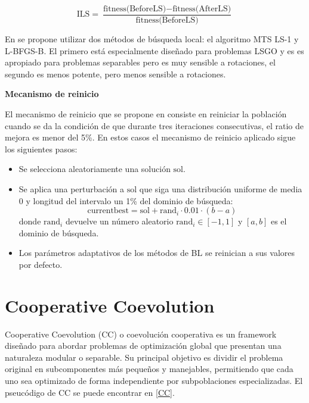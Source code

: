 \[
\text{ILS} = \frac{\text{fitness(BeforeLS)} - \text{fitness(AfterLS)}}{\text{fitness(BeforeLS)}}
\]

\vspace{10px}

En \cite{Molina2018} se propone utilizar dos métodos de búsqueda local: el algoritmo MTS LS-1 y L-BFGS-B. El primero está especialmente diseñado para problemas LSGO y es es apropiado para problemas separables pero es muy sensible a rotaciones, el segundo es menos potente, pero menos sensible a rotaciones.

\vspace{10px}

\noindent\textbf{Mecanismo de reinicio}

El mecanismo de reinicio que se propone en \citep{Molina2018} consiste en reiniciar la población cuando se da la condición de que durante tres iteraciones consecutivas, el ratio de mejora es menor del 5\%. En estos casos el mecanismo de reinicio aplicado sigue los siguientes pasos:

\begin{itemize}
    \item Se selecciona aleatoriamente una solución \( \text{sol} \).
    \item Se aplica una perturbación a \( \text{sol} \) que siga una distribución uniforme de media $0$ y longitud del intervalo un 1\% del dominio de búsqueda:
    \[
    \text{currentbest} = \text{sol} + \text{rand}_{i} \cdot 0.01 \cdot (b - a)
    \]
    donde \( \text{rand}_{i} \) devuelve un número aleatorio \( \text{rand}_{i} \in [-1, 1] \) y \( [a, b] \) es el dominio de búsqueda.
    \item Los parámetros adaptativos de los métodos de BL se reinician a sus valores por defecto.
\end{itemize}

\section{Cooperative Coevolution}

Cooperative Coevolution (CC) o coevolución cooperativa \cite{CC_orig} es un framework diseñado para abordar problemas de optimización global que presentan una naturaleza modular o separable. Su principal objetivo es dividir el problema original en subcomponentes más pequeños y manejables, permitiendo que cada uno sea optimizado de forma independiente por subpoblaciones especializadas. El pseucódigo de CC se puede encontrar en \ref{CC}.

